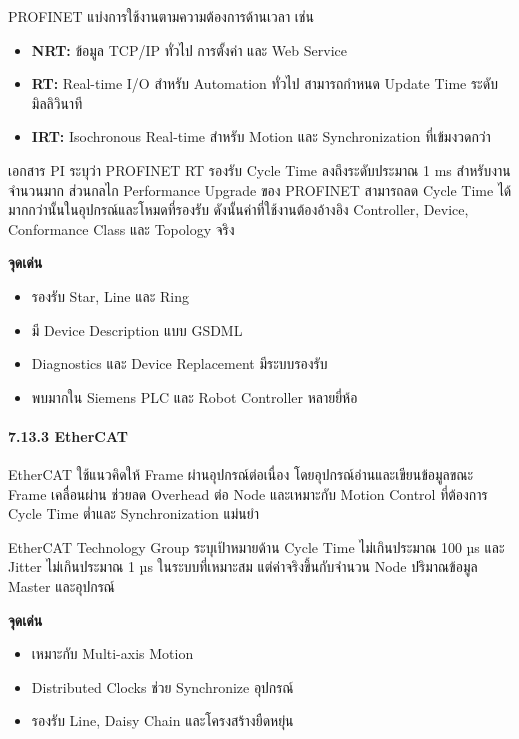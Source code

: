 PROFINET แบ่งการใช้งานตามความต้องการด้านเวลา เช่น

\begin{itemize}
    \item \textbf{NRT:} ข้อมูล TCP/IP ทั่วไป การตั้งค่า และ Web Service
    \item \textbf{RT:} Real-time I/O สำหรับ Automation ทั่วไป สามารถกำหนด Update Time ระดับมิลลิวินาที
    \item \textbf{IRT:} Isochronous Real-time สำหรับ Motion และ Synchronization ที่เข้มงวดกว่า
\end{itemize}

เอกสาร PI ระบุว่า PROFINET RT รองรับ Cycle Time ลงถึงระดับประมาณ 1 ms สำหรับงานจำนวนมาก ส่วนกลไก Performance Upgrade ของ PROFINET สามารถลด Cycle Time ได้มากกว่านั้นในอุปกรณ์และโหมดที่รองรับ ดังนั้นค่าที่ใช้งานต้องอ้างอิง Controller, Device, Conformance Class และ Topology จริง

\textbf{จุดเด่น}

\begin{itemize}
    \item รองรับ Star, Line และ Ring
    \item มี Device Description แบบ GSDML
    \item Diagnostics และ Device Replacement มีระบบรองรับ
    \item พบมากใน Siemens PLC และ Robot Controller หลายยี่ห้อ
\end{itemize}

\paragraph{7.13.3 EtherCAT}

EtherCAT ใช้แนวคิดให้ Frame ผ่านอุปกรณ์ต่อเนื่อง โดยอุปกรณ์อ่านและเขียนข้อมูลขณะ Frame เคลื่อนผ่าน ช่วยลด Overhead ต่อ Node และเหมาะกับ Motion Control ที่ต้องการ Cycle Time ต่ำและ Synchronization แม่นยำ

EtherCAT Technology Group ระบุเป้าหมายด้าน Cycle Time ไม่เกินประมาณ 100 µs และ Jitter ไม่เกินประมาณ 1 µs ในระบบที่เหมาะสม แต่ค่าจริงขึ้นกับจำนวน Node ปริมาณข้อมูล Master และอุปกรณ์

\textbf{จุดเด่น}

\begin{itemize}
    \item เหมาะกับ Multi-axis Motion
    \item Distributed Clocks ช่วย Synchronize อุปกรณ์
    \item รองรับ Line, Daisy Chain และโครงสร้างยืดหยุ่น
\end{itemize}

